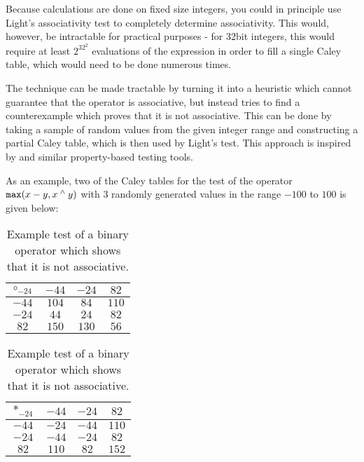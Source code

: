 Because calculations are done on fixed size integers, you could in principle use Light's
associativity test to completely determine associativity. This would, however, be
intractable for practical purposes - for 32bit integers, this would require at least
$2^{32^{2}}$ evaluations of the expression in order to fill a single Caley table, which
would need to be done numerous times.

The technique can be made tractable by turning it into a heuristic which cannot guarantee
that the operator is associative, but instead tries to find a counterexample which proves
that it is not associative. This can be done by taking a sample of random values from the
given integer range and constructing a partial Caley table, which is then used by Light's
test. This approach is inspired by \cite{quickcheck} and similar property-based
testing tools.

As an example, two of the Caley tables for the test of the operator $\texttt{max}(x - y, x \mathbin{^\wedge} y)$
with 3 randomly generated values in the range $-100$ to $100$ is given below:

\begin{table}[h!]
  \def\arraystretch{1.2}
  \begin{tabular}{|c|ccc|}
    \hline
    $\circ_{-24}$ & $-44$ & $-24$ & $82$ \\
    \hline
        $-44$ & $104$ & $84$  & $110$ \\ 
        $-24$ & $44$  & $24$  & $82$  \\
        $82$  & $150$ & $130$ & $56$  \\
    \hline
  \end{tabular}
\quad
  \begin{tabular}{|c|ccc|}
    \hline
    $*_{-24}$ & $-44$ & $-24$ & $82$ \\
    \hline
        $-44$ & $-24$ & $-44$  & $110$ \\ 
        $-24$ & $-44$  & $-24$  & $82$  \\
        $82$  & $110$ & $82$ & $152$  \\
    \hline
  \end{tabular}
  \centering
  \caption{Example test of a binary operator which shows that it is not associative.}
\end{table}
